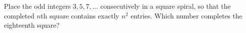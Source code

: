 Place the odd integers $3,5,7,\ldots$ consecutively in a square spiral, so that the completed $n$th square contains exactly $n^2$ entries. Which number completes the eighteenth square?
